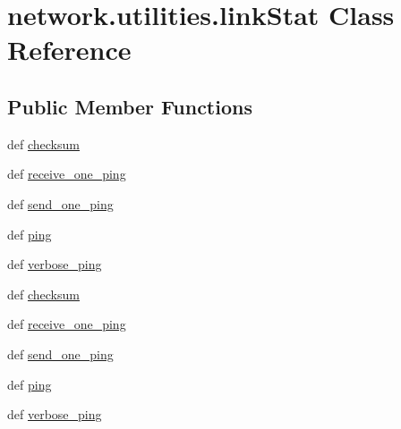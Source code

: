 \hypertarget{classnetwork_1_1utilities_1_1linkStat}{}\section{network.\+utilities.\+link\+Stat Class Reference}
\label{classnetwork_1_1utilities_1_1linkStat}
\subsection*{Public Member Functions}
\begin{DoxyCompactItemize}
\item 
def \hyperlink{classnetwork_1_1utilities_1_1linkStat_a30b4fe0361d0d934344d41b1ff05a9e4}{checksum}
\item 
def \hyperlink{classnetwork_1_1utilities_1_1linkStat_ab34b29051aaa298db40ae78ef8738179}{receive\+\_\+one\+\_\+ping}
\item 
def \hyperlink{classnetwork_1_1utilities_1_1linkStat_a9db67bf4097f75612005a9fd4df75fde}{send\+\_\+one\+\_\+ping}
\item 
def \hyperlink{classnetwork_1_1utilities_1_1linkStat_a40250efc17feca78b495dda25816497e}{ping}
\item 
def \hyperlink{classnetwork_1_1utilities_1_1linkStat_a6e84d4beb6f4411588ded2df04ffff3a}{verbose\+\_\+ping}
\item 
def \hyperlink{classnetwork_1_1utilities_1_1linkStat_a30b4fe0361d0d934344d41b1ff05a9e4}{checksum}
\item 
def \hyperlink{classnetwork_1_1utilities_1_1linkStat_ab34b29051aaa298db40ae78ef8738179}{receive\+\_\+one\+\_\+ping}
\item 
def \hyperlink{classnetwork_1_1utilities_1_1linkStat_a9db67bf4097f75612005a9fd4df75fde}{send\+\_\+one\+\_\+ping}
\item 
def \hyperlink{classnetwork_1_1utilities_1_1linkStat_a40250efc17feca78b495dda25816497e}{ping}
\item 
def \hyperlink{classnetwork_1_1utilities_1_1linkStat_a6e84d4beb6f4411588ded2df04ffff3a}{verbose\+\_\+ping}
\end{DoxyCompactItemize}


